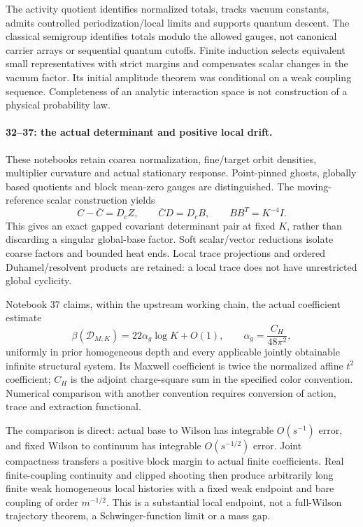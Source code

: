 The activity quotient identifies normalized
totals, tracks vacuum constants, admits
controlled periodization/local limits and
supports quantum descent. The classical
semigroup identifies totals modulo the
allowed gauges, not canonical carrier arrays
or sequential quantum cutoffs.
Finite induction selects equivalent small
representatives with strict margins and
compensates scalar changes in the vacuum
factor. Its initial amplitude theorem was
conditional on a weak coupling sequence.
Completeness of an analytic interaction
space is not construction of a physical
probability law.

\paragraph{32--37: the actual determinant and positive local drift.}
These notebooks retain coarea normalization,
fine/target orbit densities, multiplier
curvature and actual stationary response.
Point-pinned ghosts, globally based quotients
and block mean-zero gauges are distinguished.
The moving-reference scalar construction yields
\[
 C-\bar C=D_cZ,\qquad \bar C D=D_cB,
 \qquad BB^T=K^{-4}I .
\]
This gives an exact gapped covariant
determinant pair at fixed \(K\), rather
than discarding a singular global-base
factor. Soft scalar/vector reductions
isolate coarse factors and bounded heat
ends. Local trace projections and ordered
Duhamel/resolvent products are retained:
a local trace does not have unrestricted
global cyclicity.

Notebook 37 claims, within the upstream
working chain, the actual coefficient estimate
\[
 \beta(\mathcal D_{M,K})
   =22\alpha_g\log K+O(1),\qquad
 \alpha_g=\frac{C_H}{48\pi^2},
\]
uniformly in prior homogeneous depth and
every applicable jointly obtainable
infinite structural system. Its Maxwell
coefficient is twice the normalized
affine \(t^2\) coefficient; \(C_H\) is
the adjoint charge-square sum in the
specified color convention. Numerical
comparison with another convention
requires conversion of action, trace
and extraction functional.

The comparison is direct: actual base
to Wilson has integrable \(O(s^{-1})\)
error, and fixed Wilson to continuum
has integrable \(O(s^{-1/2})\) error.
Joint compactness transfers a positive
block margin to actual finite coefficients.
Real finite-coupling continuity and
clipped shooting then produce arbitrarily
long finite weak homogeneous local
histories with a fixed weak endpoint
and bare coupling of order \(m^{-1/2}\).
This is a substantial local endpoint,
not a full-Wilson trajectory theorem,
a Schwinger-function limit or a mass gap.


